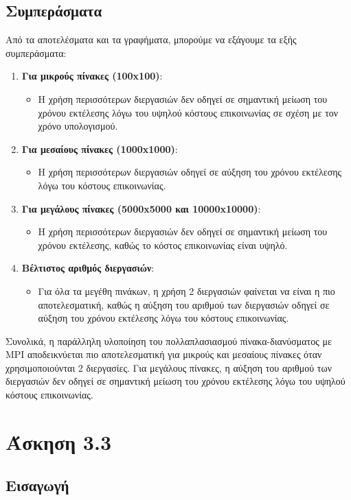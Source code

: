 \documentclass{article}
\begin{document}
\subsection*{Συμπεράσματα}
Από τα αποτελέσματα και τα γραφήματα, μπορούμε να εξάγουμε τα εξής συμπεράσματα:
\begin{enumerate}
    \item \textbf{Για μικρούς πίνακες (100x100)}:
    \begin{itemize}
        \item Η χρήση περισσότερων διεργασιών δεν οδηγεί σε σημαντική μείωση του χρόνου εκτέλεσης λόγω του υψηλού κόστους επικοινωνίας σε σχέση με τον χρόνο υπολογισμού.
    \end{itemize}
    \item \textbf{Για μεσαίους πίνακες (1000x1000)}:
    \begin{itemize}
        \item Η χρήση περισσότερων διεργασιών οδηγεί σε αύξηση του χρόνου εκτέλεσης λόγω του κόστους επικοινωνίας.
    \end{itemize}
    \item \textbf{Για μεγάλους πίνακες (5000x5000 και 10000x10000)}:
    \begin{itemize}
        \item Η χρήση περισσότερων διεργασιών δεν οδηγεί σε σημαντική μείωση του χρόνου εκτέλεσης, καθώς το κόστος επικοινωνίας είναι υψηλό.
    \end{itemize}
    \item \textbf{Βέλτιστος αριθμός διεργασιών}:
    \begin{itemize}
        \item Για όλα τα μεγέθη πινάκων, η χρήση 2 διεργασιών φαίνεται να είναι η πιο αποτελεσματική, καθώς η αύξηση του αριθμού των διεργασιών οδηγεί σε αύξηση του χρόνου εκτέλεσης λόγω του κόστους επικοινωνίας.
    \end{itemize}
\end{enumerate}
Συνολικά, η παράλληλη υλοποίηση του πολλαπλασιασμού πίνακα-διανύσματος με MPI αποδεικνύεται πιο αποτελεσματική για μικρούς και μεσαίους πίνακες όταν χρησιμοποιούνται 2 διεργασίες. Για μεγάλους πίνακες, η αύξηση του αριθμού των διεργασιών δεν οδηγεί σε σημαντική μείωση του χρόνου εκτέλεσης λόγω του υψηλού κόστους επικοινωνίας.
\section*{Άσκηση 3.3}
\subsection*{Εισαγωγή}
\end{document}

